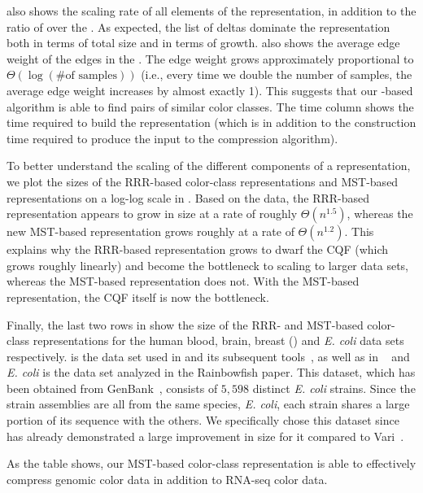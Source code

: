  also shows the scaling rate of all elements of
the \mst representation, in addition to the ratio of \mst over the
\cbv.  As expected, the list of deltas dominate the \mst
representation both in terms of total size and in terms of
growth.  also shows the average edge weight of
the edges in the \mst.  The edge weight grows approximately
proportional to $\Theta(\log(\text{\# of samples}))$ (i.e., every time
we double the number of samples, the average edge weight increases by
almost exactly 1). This suggests that our \dbg-based algorithm
is able to find pairs of similar color classes. The time column shows the time
required to build the \mst representation (which is in addition to the \mantis
construction time required to produce the input to the \mst compression
algorithm).

To better understand the scaling of the different components of a
\cdbg representation, we plot the sizes of the RRR-based color-class
representations and MST-based representations on a log-log scale in
. Based on the data, the RRR-based
representation appears to grow in size at a rate of roughly
$\Theta(n^{1.5})$, whereas the new MST-based representation grows
roughly at a rate of $\Theta(n^{1.2})$. This explains why the
RRR-based representation grows to dwarf the CQF (which grows roughly
linearly) and become the bottleneck to scaling to larger data sets,
whereas the MST-based representation does not. With the MST-based
representation, the CQF itself is now the bottleneck.

Finally, the last two rows in  show the size of the RRR- and MST-based
color-class representations for the human blood, brain, breast (\bbb) and \textit{E. coli} data sets respectively.
\bbb is the data set used in \sbt and
its subsequent tools~\citep{Solomon2017Improved,Sun2017Allsome,seqothello},
as well as in \mantis~\citep{mantis}
and \textit{E. coli} is the data set analyzed in the Rainbowfish paper.
This dataset, which has been obtained from
GenBank~\cite{o2015reference}, consists of $5,598$ distinct \emph{E. coli}
strains. Since the strain assemblies are all from the same species,
\emph{E. coli}, each strain shares a large portion of its sequence with the others.
We specifically chose this dataset since \rainbowfish has already
demonstrated a large improvement in size for it compared to
Vari~\citep{MuggliBoNo17}.

As the table shows, our MST-based
color-class representation is able to effectively compress genomic
color data in addition to RNA-seq color data.

